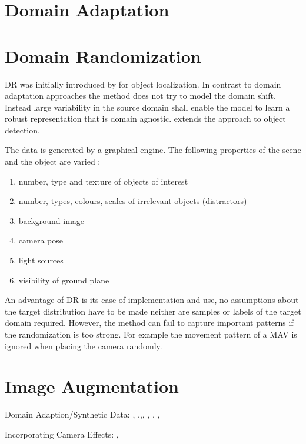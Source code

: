 \section{Domain Adaptation}

\section{Domain Randomization}

\ac{DR} was initially introduced by \cite{Tobin2017} for object localization. In contrast to domain adaptation approaches the method does not try to model the domain shift. Instead large variability in the source domain shall enable the model to learn a robust representation that is domain agnostic. \cite{Tremblay2018a} extends the approach to object detection.

The data is generated by a graphical engine. The following properties of the scene and the object are varied \cite{Tremblay2018a}:

\begin{enumerate}
	\item number, type and texture of objects of interest
	\item number, types, colours, scales of irrelevant objects (distractors)
	\item background image
	\item camera pose
	\item light sources
	\item visibility of ground plane
\end{enumerate}

An advantage of \ac{DR} is its ease of implementation and use, no assumptions about the target distribution have to be made neither are samples or labels of the target domain required. However, the method can fail to capture important patterns if the randomization is too strong. For example the movement pattern of a \ac{MAV} is ignored when placing the camera randomly.


\section{Image Augmentation}


Domain Adaption/Synthetic Data:
 \cite{Chen2018c}, \cite{Xu2017}
\cite{Tremblay2018a} ,\cite{Inoue},\cite{Peng},
\cite{Rozantsev},  \cite{Le}, \cite{Liu2017}, \cite{Peng2017}

Incorporating Camera Effects:
\cite{Carlson2018},\cite{Vass}

